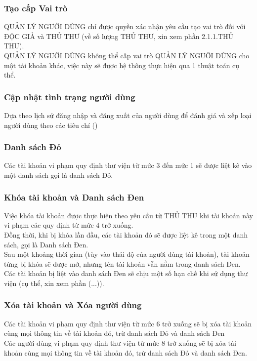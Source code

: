 \documentclass[12pt,a4paper]{report}
\begin{document}
			\subsubsection{Tạo cấp Vai trò}
			QUẢN LÝ NGƯỜI DÙNG chỉ được quyền xác nhận yêu cầu tạo vai trò đối với ĐỘC GIẢ và THỦ THƯ (về số lượng THỦ THƯ, xin xem phần 2.1.1.THỦ THƯ).\\
			QUẢN LÝ NGƯỜI DÙNG không thể cấp vai trò QUẢN LÝ NGƯỜI DÙNG cho một tài khoản khác, việc này sẽ được hệ thông thực hiện qua 1 thuật toán cụ thể.\\

			\subsubsection{Cập nhật tình trạng người dùng}
			Dựa theo lịch sử đăng nhập và đăng xuất của người dùng để đánh giá và xếp loại người dùng theo các tiêu chí ()\\ %

			\subsubsection{Danh sách Đỏ}
			Các tài khoản vi phạm quy định thư viện từ mức 3 đến mức 1 sẽ được liệt kê vào một danh sách gọi là danh sách Đỏ.\\

			\subsubsection{Khóa tài khoản và Danh sách Đen}
			Việc khóa tài khoản được thực hiện theo yêu cầu từ THỦ THƯ khi tài khoản này vi phạm các quy định từ mức 4 trở xuống.\\
			Đồng thời, khi bị khóa lần đầu, các tài khoản đó sẽ được liệt kê trong một danh sách, gọi là Danh sách Đen.\\
			Sau một khoảng thời gian (tùy vào thái độ của người dùng tài khoản), tài khoản từng bị khóa sẽ được mở, nhưng tên tài khoản vẫn nằm trong danh sách Đen.\\
			Các tài khoản bị liệt vào danh sách Đen sẽ chịu một số hạn chế khi sử dụng thư viện (cụ thể, xin xem phần (...)).\\

			\subsubsection{Xóa tài khoản và Xóa người dùng}
			Các tài khoản vi phạm quy định thư viện từ mức 6 trở xuống sẽ bị xóa tài khoản cùng mọi thông tin về tài khoản đó, trừ danh sách Đỏ và danh sách Đen\\
			Các người dùng vi phạm quy định thư viện từ mức 8 trở xuống sẽ bị xóa tài khoản cùng mọi thông tin về tài khoản đó, trừ danh sách Đỏ và danh sách Đen.\\
\end{document}
